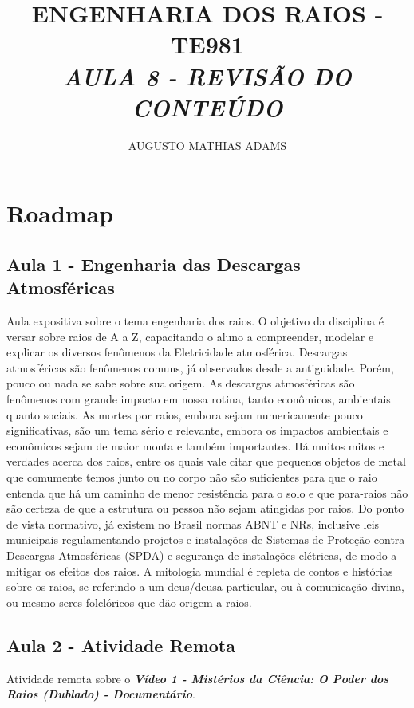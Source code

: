 \documentclass[a4paper, 12pt, onecolumn,singlespacing]{article}
\title{\normalsize{ENGENHARIA DOS RAIOS - TE981}\\ \huge{\textbf\textit{{AULA 8 - REVISÃO DO CONTEÚDO}}\\}}
\author{\small{AUGUSTO MATHIAS ADAMS}}
\begin{document}
	
	\maketitle
	
	\section{Roadmap}
	\subsection{Aula 1 - Engenharia das Descargas Atmosféricas}
	
	Aula expositiva sobre o tema engenharia dos raios. O objetivo da disciplina é versar sobre raios de A a Z, capacitando o aluno a compreender, modelar e explicar os diversos fenômenos da Eletricidade atmosférica. Descargas atmosféricas são fenômenos comuns, já observados desde a antiguidade. Porém, pouco ou nada se sabe sobre sua origem. As descargas atmosféricas são fenômenos com grande impacto em nossa rotina, tanto econômicos,	ambientais quanto sociais. As mortes por raios, embora sejam numericamente pouco significativas, são um tema sério e relevante, embora os impactos ambientais e econômicos sejam de maior monta e também importantes. Há muitos mitos e verdades acerca dos raios, entre os quais vale citar que pequenos objetos de metal que comumente temos junto ou no corpo não são suficientes para que o raio entenda que há um caminho de menor resistência para o solo e que para-raios não são certeza de que a estrutura ou pessoa não sejam atingidas por raios. Do ponto de vista normativo, já existem no Brasil normas ABNT e NRs, inclusive leis municipais regulamentando projetos e instalações de Sistemas de Proteção contra Descargas Atmosféricas (SPDA) e segurança de instalações elétricas, de modo a mitigar os efeitos dos raios. A mitologia mundial é repleta de contos e histórias sobre os raios, se referindo a um deus/deusa particular, ou à comunicação divina, ou mesmo seres folclóricos que dão origem a raios.
	
	\subsection{Aula 2 - Atividade Remota}
	
	Atividade remota sobre o \textbf{\textit{Vídeo 1 - Mistérios da Ciência: O Poder dos Raios (Dublado) - Documentário}}.
	
\end{document}
